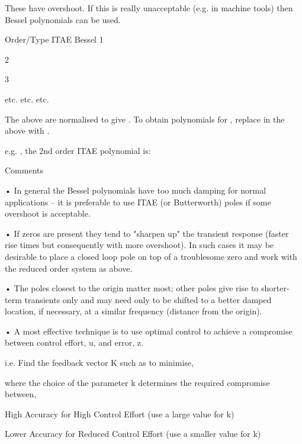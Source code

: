 These have overshoot. If this is really unacceptable (e.g. in machine tools) then Bessel polynomials can be used.


Order/Type	ITAE	Bessel
1	 
 
2	 
 
3	 
 
etc.	etc.	etc.

 
The above are normalised to give  . To obtain polynomials for  , replace   in the above with  .

e.g.  , the 2nd order ITAE polynomial is:
 

Comments

•	In general the Bessel polynomials have too much damping for normal applications – it is preferable to use ITAE (or Butterworth) poles if some overshoot is acceptable.

•	If zeros are present they tend to "sharpen up" the transient response (faster rise times but consequently with more overshoot). In such cases it may be desirable to place a closed loop pole on top of a troublesome zero and work with the reduced order system as above.

•	The poles closest to the origin matter most; other poles give rise to shorter-term transients only and may need only to be shifted to a better damped location, if necessary, at a similar frequency (distance from the origin).
 
•	A most effective technique is to use optimal control to achieve a compromise between control effort, u, and error, z.

i.e. Find the feedback vector K such as to minimise,
 

where the choice of the parameter k determines the required compromise between,

High Accuracy for High Control Effort
                  (use a large value for k)

Lower Accuracy for Reduced Control Effort
                  (use a smaller value for k)





\endinput

